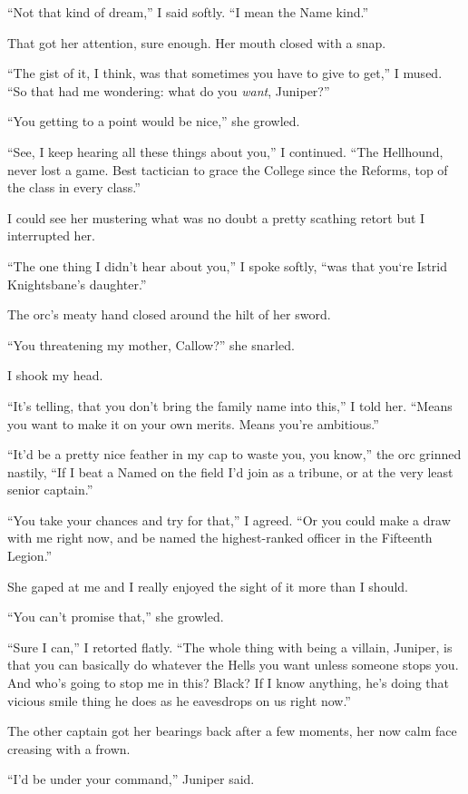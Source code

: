 \documentclass[12pt, openany]{book}
\begin{document}
“Not that kind of dream,” I said softly. “I mean the Name kind.”

That got her attention, sure enough. Her mouth closed with a snap.

“The gist of it, I think, was that sometimes you have to give to get,” I mused. “So that had me wondering: what do you \textit{want}, Juniper?”

“You getting to a point would be nice,” she growled.

“See, I keep hearing all these things about you,” I continued. “The Hellhound, never lost a game. Best tactician to grace the College since the Reforms, top of the class in every class.”

I could see her mustering what was no doubt a pretty scathing retort but I interrupted her.

“The one thing I didn’t hear about you,” I spoke softly, “was that you‘re Istrid Knightsbane’s daughter.”

The orc’s meaty hand closed around the hilt of her sword.

“You threatening my mother, Callow?” she snarled.

I shook my head.

“It’s telling, that you don’t bring the family name into this,” I told her. “Means you want to make it on your own merits. Means you’re ambitious.”

“It’d be a pretty nice feather in my cap to waste you, you know,” the orc grinned nastily, “If I beat a Named on the field I’d join as a tribune, or at the very least senior captain.”

“You take your chances and try for that,” I agreed. “Or you could make a draw with me right now, and be named the highest-ranked officer in the Fifteenth Legion.”

She gaped at me and I really enjoyed the sight of it more than I should.

“You can’t promise that,” she growled.

“Sure I can,” I retorted flatly. “The whole thing with being a villain, Juniper, is that you can basically do whatever the Hells you want unless someone stops you. And who’s going to stop me in this? Black? If I know anything, he’s doing that vicious smile thing he does as he eavesdrops on us right now.”

The other captain got her bearings back after a few moments, her now calm face creasing with a frown.

“I’d be under your command,” Juniper said.
\end{document}
